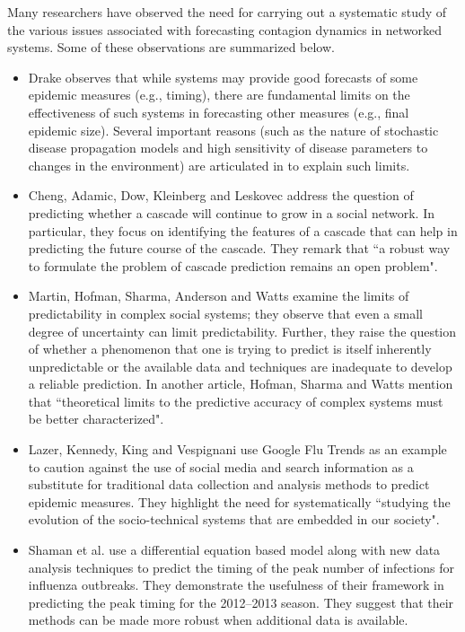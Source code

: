 \medskip
Many researchers have observed the need for carrying out
a systematic study of the various issues associated with forecasting
contagion dynamics in networked systems.
Some of these observations are summarized below.

\begin{itemize}
\item
Drake \cite{Drake-2005, Drake-2006} observes that
while systems may provide good forecasts 
of some epidemic  measures (e.g., timing),
there are fundamental limits on the effectiveness
of such systems in forecasting other measures (e.g., final epidemic size).
Several important reasons (such as the nature of stochastic 
disease propagation models and high sensitivity of disease parameters
to changes in the environment)
are articulated in \cite{Drake-2005,Drake-2006}
to explain such limits. 

\item
Cheng, Adamic, Dow, Kleinberg and Leskovec \cite{Cheng_etal_2016}
address the question of predicting whether a cascade will continue
to grow in a social network.  
In particular, they focus on identifying the features of a cascade
that can help in predicting the future course of the cascade.
They remark that ``a robust way to formulate the problem of cascade
prediction remains an open problem".

\item
Martin, Hofman, Sharma, Anderson and Watts \cite{Martin_etal_2016}
examine the limits of predictability
in complex social systems; they observe that even a small degree of
uncertainty can limit predictability.
Further, they raise the question of whether a phenomenon that
one is trying to predict is itself inherently unpredictable or 
the available data and techniques are inadequate to develop a
reliable prediction.
In another article, Hofman, Sharma and Watts \cite{Hofman-etal-2017}
mention that ``theoretical limits to the predictive accuracy of
complex systems must be better characterized".

\item 
Lazer, Kennedy, King and Vespignani \cite{lazer:science14} use 
Google Flu Trends as an example to caution against the use of social media 
and search information as a substitute for traditional data collection
and analysis methods to predict epidemic measures.
They highlight the need for systematically ``studying the evolution of the
socio-technical systems that are embedded in our society".

\item
Shaman et al. \cite{Shaman-etal-2012,Shaman-etal-2013}
use a differential equation based model along with new
data analysis techniques to predict the timing of the peak number of
infections for influenza outbreaks.
They demonstrate the usefulness of their framework in
predicting the peak timing for the 2012--2013 season.
They suggest that their methods can be made more robust 
when additional data is available. 


\end{itemize}
